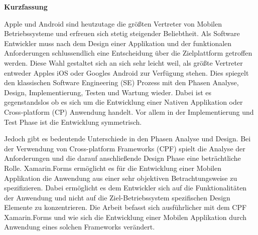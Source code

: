 %
%
% 
% 



\cleardoublepage

\begin{center}
{\Large\bfseries Kurzfassung}
\end{center}

Apple und Android sind heutzutage die größten Vertreter von Mobilen Betriebssysteme und erfreuen sich stetig steigender Beliebtheit. Als Software Entwickler muss nach dem Design einer Applikation und der funktionalen Anforderungen schlussendlich eine Entscheidung über die Zielplattform getroffen werden. Diese Wahl gestaltet sich an sich sehr leicht weil, als größte Vertreter entweder Apples iOS oder Googles Android zur Verfügung stehen. Dies spiegelt den klassischen Software Engineering (SE) Prozess mit den Phasen Analyse, Design, Implementierung, Testen und Wartung wieder. Dabei ist es gegenstandslos ob es sich um die Entwicklung einer Nativen Applikation oder Cross-platform (CP) Anwendung handelt. Vor allem in der Implementierung und Test Phase ist die Entwicklung symmetrisch.

Jedoch gibt es bedeutende Unterschiede in den Phasen Analyse und Design. Bei der Verwendung von Cross-platform Frameworks (CPF) spielt die Analyse der Anforderungen und die darauf anschließende Design Phase eine beträchtliche Rolle. Xamarin.Forms ermöglicht es für die Entwicklung einer Mobilen Applikation die Anwendung aus einer sehr objektiven Betrachtungsweise zu spezifizieren. Dabei ermöglicht es dem Entwickler sich auf die Funktionalitäten der Anwendung und nicht auf die Ziel-Betriebssystem spezifischen Design Elemente zu konzentrieren. Die Arbeit befasst sich ausführlicher mit dem CPF Xamarin.Forms und wie sich die Entwicklung einer Mobilen Applikation durch Anwendung eines solchen Frameworks verändert.


\cleardoublepage


